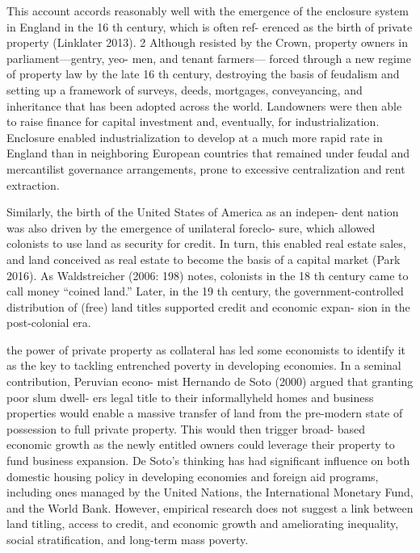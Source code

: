 \documentclass[
]{book}
\begin{document}
This account accords reasonably well with the emergence of the
enclosure system in England in the 16 th century, which is often ref-
erenced as the birth of private property (Linklater 2013). 2 Although
resisted by the Crown, property owners in parliament---­gentry, yeo-
men, and tenant farmers---­ forced through a new regime of property
law by the late 16 th century, destroying the basis of feudalism and
setting up a framework of surveys, deeds, mortgages, conveyancing,
and inheritance that has been adopted across the world. Landowners
were then able to raise finance for capital investment and, eventually,
for industrialization. Enclosure enabled industrialization to develop
at a much more rapid rate in England than in neighboring European
countries that remained under feudal and mercantilist governance
arrangements, prone to excessive centralization and rent extraction.

Similarly, the birth of the United States of America as an indepen-
dent nation was also driven by the emergence of unilateral foreclo-
sure, which allowed colonists to use land as security for credit. In
turn, this enabled real estate sales, and land conceived as real estate
to become the basis of a capital market (Park 2016). As Waldstreicher
(2006: 198) notes, colonists in the 18 th century came to call money
``coined land.'' Later, in the 19 th century, the government-­controlled
distribution of (free) land titles supported credit and economic expan-
sion in the post-­colonial era.

the power of private property as collateral has led some
economists to identify it as the key to tackling entrenched poverty in
developing economies. In a seminal contribution, Peruvian econo-
mist Hernando de Soto (2000) argued that granting poor slum dwell-
ers legal title to their informallyheld homes and business properties
would enable a massive transfer of land from the pre-­modern state
of possession to full private property. This would then trigger broad-­
based economic growth as the newly entitled owners could leverage
their property to fund business expansion. De Soto's thinking has had
significant influence on both domestic housing policy in developing
economies and foreign aid programs, including ones managed by the
United Nations, the International Monetary Fund, and the World Bank.
However, empirical research does
not suggest a link between land titling, access to credit, and economic
growth and ameliorating inequality, social stratification, and long-­term
mass poverty.
\end{document}
